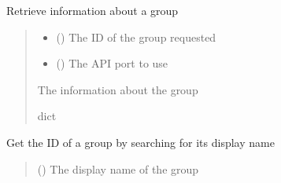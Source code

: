 \documentclass[letterpaper,10pt,english]{sphinxmanual}
\begin{document}
\begin{fulllineitems}
\begin{fulllineitems}
\label{\detokenize{aisquared.platform:aisquared.platform.AISquaredPlatformClient.AISquaredPlatformClient.get_group}}
\pysigstartsignatures
{}
\pysigstopsignatures
\sphinxAtStartPar
Retrieve information about a group
\begin{quote}\begin{description}
\begin{itemize}
\item {} 
\sphinxAtStartPar
{} () \textendash{} The ID of the group requested

\item {} 
\sphinxAtStartPar
{} (\sphinxstyleliteralemphasis{\sphinxupquote{ (}}\sphinxstyleliteralemphasis{\sphinxupquote{)}}) \textendash{} The API port to use

\end{itemize}

\sphinxAtStartPar
{} \textendash{} The information about the group

\sphinxAtStartPar
dict

\end{description}\end{quote}

\end{fulllineitems}


\begin{fulllineitems}
\label{\detokenize{aisquared.platform:aisquared.platform.AISquaredPlatformClient.AISquaredPlatformClient.get_group_id_by_name}}
\pysigstartsignatures
{}
\pysigstopsignatures
\sphinxAtStartPar
Get the ID of a group by searching for its display name
\begin{quote}\begin{description}
\sphinxAtStartPar
{} () \textendash{} The display name of the group


\end{description}
\end{quote}
\end{fulllineitems}
\end{fulllineitems}
\end{document}
